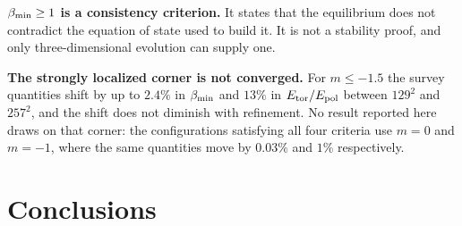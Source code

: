 \documentclass[twocolumn,linenumbers]{aastex701}
\newcommand{\Msun}{M_\odot}
\newcommand{\Etor}{E_{\rm tor}}
\newcommand{\Epol}{E_{\rm pol}}
\newcommand{\Mch}{M_{\rm Ch}}
\newcommand{\bmin}{\beta_{\rm min}}
\begin{document}
\textbf{$\bmin \ge 1$ is a consistency criterion.} It states that the
equilibrium does not contradict the equation of state used to build it. It is
not a stability proof, and only three-dimensional evolution can supply one.

\textbf{The strongly localized corner is not converged.} For
$m \le -1.5$ the survey quantities shift by up to $2.4\%$ in $\bmin$ and
$13\%$ in $\Etor/\Epol$ between $129^2$ and $257^2$, and the shift does not
diminish with refinement. No result reported here draws on that corner: the
configurations satisfying all four criteria use $m = 0$ and $m = -1$, where
the same quantities move by $0.03\%$ and $1\%$ respectively.

\section{Conclusions} \label{sec:conclusions}

\end{document}
